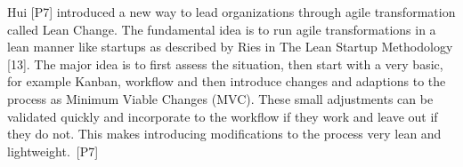 Hui [P7] introduced a new way to lead organizations through agile
transformation called Lean Change. The fundamental idea is to run agile
transformations in a lean manner like startups as described by Ries in
The Lean Startup Methodology [13]. The major idea is to first assess the
situation, then start with a very basic, for example Kanban, workflow
and then introduce changes and adaptions to the process as Minimum
Viable Changes (MVC). These small adjustments can be validated quickly
and incorporate to the workflow if they work and leave out if they do
not. This makes introducing modifications to the process very lean and
lightweight. [P7]
